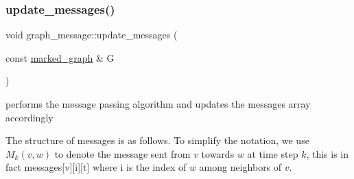 \subsubsection{\texorpdfstring{update\+\_\+messages()}{update\_messages()}}
{\footnotesize\ttfamily void graph\+\_\+message\+::update\+\_\+messages (\begin{DoxyParamCaption}\item[{const \hyperlink{classmarked__graph}{marked\+\_\+graph} \&}]{G }\end{DoxyParamCaption})\hspace{0.3cm}{\ttfamily [private]}}



performs the message passing algorithm and updates the messages array accordingly 

The structure of messages is as follows. To simplify the notation, we use $M_k(v,w)$ to denote the message sent from $v$ towards $w$ at time step $k$, this is in fact messages\mbox{[}v\mbox{]}\mbox{[}i\mbox{]}\mbox{[}t\mbox{]} where i is the index of $w$ among neighbors of $v$.


